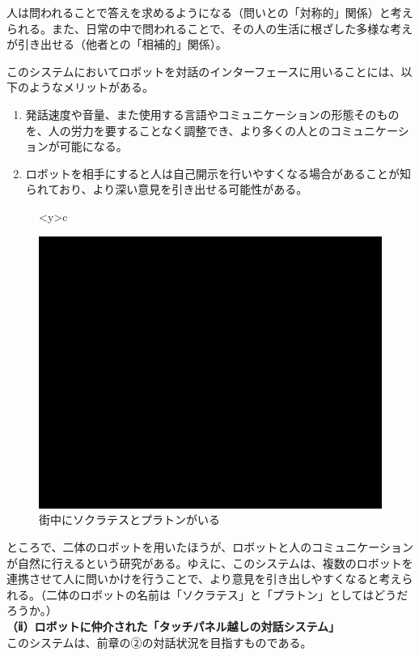 \documentclass[9pt,b5j,twoside,twocolumn]{utarticle}
\begin{document}
人は問われることで答えを求めるようになる（問いとの「対称的」関係）と考えられる。また、日常の中で問われることで、その人の生活に根ざした多様な考えが引き出せる（他者との「相補的」関係）。


このシステムにおいてロボットを対話のインターフェースに用いることには、以下のようなメリットがある。
\begin{enumerate}
 \setlength{\itemsep}{-2mm} 
\renewcommand{\labelenumi}{\pbox<y>{(\arabic{enumi})}}
\item 発話速度や音量、また使用する言語やコミュニケーションの形態そのものを、人の労力を要することなく調整でき、より多くの人とのコミュニケーションが可能になる。
\item ロボットを相手にすると人は自己開示を行いやすくなる場合があることが知られており\cite{SHIMA}\cite{KAIJI}、より深い意見を引き出せる可能性がある。
\end{enumerate}

\begin{figure}[h]
\centering
\begin{tabular}<y>{c}
\begin{minipage}[c]{0.60\hsize}
\centering
\includegraphics[scale=0.5]{system1}
\caption{街中にソクラテスとプラトンがいる}
\end{minipage}
\end{tabular}
\end{figure}
ところで、二体のロボットを用いたほうが、ロボットと人のコミュニケーションが自然に行えるという研究がある\cite{MUL}。ゆえに、このシステムは、複数のロボットを連携させて人に問いかけを行うことで、より意見を引き出しやすくなると考えられる。（二体のロボットの名前は「ソクラテス」と「プラトン」としてはどうだろうか。）\\
\textbf{（ⅱ）ロボットに仲介された「タッチパネル越しの対話システム」}\\
このシステムは、前章の②の対話状況を目指すものである。
\end{document}
